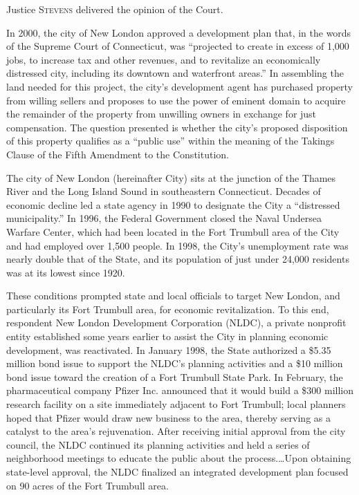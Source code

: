 

\opinion Justice \textsc{Stevens} delivered the opinion of the Court.

In 2000, the city of New London approved a development plan that, in the words
of the Supreme Court of Connecticut, was ``projected to create in excess of
1,000 jobs, to increase tax and other revenues, and to revitalize an
economically distressed city, including its downtown and waterfront areas.'' In
assembling the land needed for this project, the city's development agent has
purchased property from willing sellers and proposes to use the power of eminent
domain to acquire the remainder of the property from unwilling owners in
exchange for just compensation. The question presented is whether the city's
proposed disposition of this property qualifies as a ``public use'' within the
meaning of the Takings Clause of the Fifth Amendment to the Constitution.



The city of New London (hereinafter City) sits at the junction of the Thames
River and the Long Island Sound in southeastern Connecticut. Decades of economic
decline led a state agency in 1990 to designate the City a ``distressed
municipality.'' In 1996, the Federal Government closed the Naval Undersea
Warfare Center, which had been located in the Fort Trumbull area of the City and
had employed over 1,500 people. In 1998, the City's unemployment rate was nearly
double that of the State, and its population of just under 24,000 residents was
at its lowest since 1920.

These conditions prompted state and local officials to target New London, and
particularly its Fort Trumbull area, for economic revitalization. To this end,
respondent New London Development Corporation (NLDC), a private nonprofit entity
established some years earlier to assist the City in planning economic
development, was reactivated. In January 1998, the State authorized a \$5.35
million bond issue to support the NLDC's planning activities and a \$10 million
bond issue toward the creation of a Fort Trumbull State Park. In February, the
pharmaceutical company Pfizer Inc. announced that it would build a \$300 million
research facility on a site immediately adjacent to Fort Trumbull; local
planners hoped that Pfizer would draw new business to the area, thereby serving
as a catalyst to the area's rejuvenation. After receiving initial approval from
the city council, the NLDC continued its planning activities and held a series
of neighborhood meetings to educate the public about the process.\ldots Upon
obtaining state-level approval, the NLDC finalized an integrated development
plan focused on 90 acres of the Fort Trumbull area.

